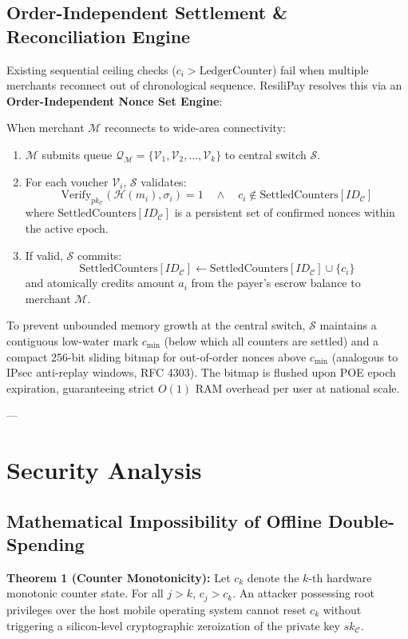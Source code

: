 \documentclass[conference]{IEEEtran}
\begin{document}
\subsection{Order-Independent Settlement \& Reconciliation Engine}
Existing sequential ceiling checks ($c_i > \text{LedgerCounter}$) fail when multiple merchants reconnect out of chronological sequence. ResiliPay resolves this via an \textbf{Order-Independent Nonce Set Engine}:

When merchant $\mathcal{M}$ reconnects to wide-area connectivity:
\begin{enumerate}
    \item $\mathcal{M}$ submits queue $\mathcal{Q}_{\mathcal{M}} = \{\mathcal{V}_1, \mathcal{V}_2, \dots, \mathcal{V}_k\}$ to central switch $\mathcal{S}$.
    \item For each voucher $\mathcal{V}_i$, $\mathcal{S}$ validates:
    \begin{equation}
    \text{Verify}_{pk_{\mathcal{C}}}(\mathcal{H}(m_i), \sigma_i) = 1 \quad \land \quad c_i \notin \text{SettledCounters}[ID_{\mathcal{C}}]
    \end{equation}
    where $\text{SettledCounters}[ID_{\mathcal{C}}]$ is a persistent set of confirmed nonces within the active epoch.
    \item If valid, $\mathcal{S}$ commits:
    \begin{equation}
    \text{SettledCounters}[ID_{\mathcal{C}}] \leftarrow \text{SettledCounters}[ID_{\mathcal{C}}] \cup \{c_i\}
    \end{equation}
    and atomically credits amount $a_i$ from the payer's escrow balance to merchant $\mathcal{M}$.
\end{enumerate}
To prevent unbounded memory growth at the central switch, $\mathcal{S}$ maintains a contiguous low-water mark $c_{\min}$ (below which all counters are settled) and a compact 256-bit sliding bitmap for out-of-order nonces above $c_{\min}$ (analogous to IPsec anti-replay windows, RFC 4303). The bitmap is flushed upon POE epoch expiration, guaranteeing strict $O(1)$ RAM overhead per user at national scale.

---

\section{Security Analysis}

\subsection{Mathematical Impossibility of Offline Double-Spending}
\textbf{Theorem 1 (Counter Monotonicity):} Let $c_k$ denote the $k$-th hardware monotonic counter state. For all $j > k$, $c_j > c_k$. An attacker possessing root privileges over the host mobile operating system cannot reset $c_k$ without triggering a silicon-level cryptographic zeroization of the private key $sk_{\mathcal{C}}$.
\end{document}

